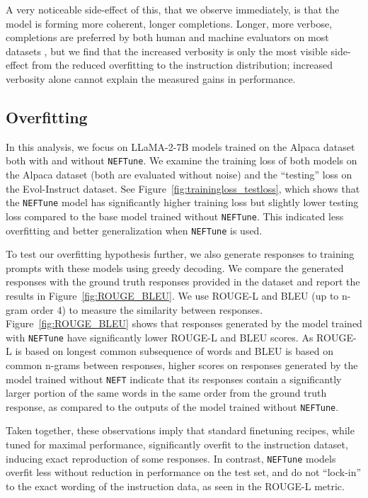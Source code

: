 \documentclass{article} %
\newcommand{\neft}{\texttt{NEFT}}
\newcommand{\neftune}{\texttt{NEFTune}}
\newcommand{\llama}{LLaMA}
\begin{document}
A very noticeable side-effect of this, that we observe immediately, is that the model is forming more coherent, longer completions. Longer, more verbose, completions are preferred by both human and machine evaluators on most datasets \citep{dubois2023alpacafarm}, but we find that the increased verbosity is only the most visible side-effect from the reduced overfitting to the instruction distribution; increased verbosity alone cannot explain the measured gains in performance. 

\subsection{Overfitting} \label{sec:overfitting}
In this analysis, we focus on \llama{}-2-7B models trained on the Alpaca dataset both with and without \neftune{}.
We examine the training loss of both models on the Alpaca dataset (both are evaluated without noise) and the ``testing'' loss on the Evol-Instruct dataset. See Figure~\ref{fig:trainingloss_testloss}, which shows that the \neftune{} model has significantly higher training loss but slightly lower testing loss compared to the base model trained without \neftune{}.  This indicated less overfitting and better generalization when \neftune{} is used.

To test our overfitting hypothesis further, we also generate responses to training prompts with these models using greedy decoding. We compare the generated responses with the ground truth responses provided in the dataset and report the results in Figure~\ref{fig:ROUGE_BLEU}. We use ROUGE-L \citep{lin2004rouge} and BLEU (up to n-gram order 4) \citep{papineni02bleu} to measure the similarity between responses. Figure~\ref{fig:ROUGE_BLEU} shows that responses generated by the model trained with \neftune{} have significantly lower ROUGE-L and BLEU scores.
As ROUGE-L is based on longest common subsequence of words and BLEU is based on common n-grams between responses, higher scores on responses generated by the model trained without \neft{} indicate that its responses contain a significantly larger portion of the same words in the same order from the ground truth response, as compared to the outputs of the model trained without \neftune{}. 

Taken together, these observations imply that standard finetuning recipes, while tuned for maximal performance, significantly overfit to the instruction dataset, inducing exact reproduction of some responses. In contrast, \neftune{} models overfit less without reduction in performance on the test set, and do not ``lock-in'' to the exact wording of the instruction data, as seen in the ROUGE-L metric.
\end{document}
